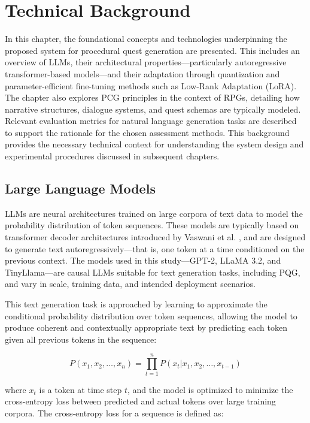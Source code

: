 \clearpage

\chapter{Technical Background}

In this chapter, the foundational concepts and technologies underpinning the proposed system for procedural
quest generation are presented. This includes an overview of
LLMs, their architectural properties—particularly autoregressive transformer-based models—and
their adaptation through quantization and parameter-efficient fine-tuning methods
such as Low-Rank Adaptation (LoRA). The chapter also explores PCG principles
in the context of RPGs, detailing how narrative structures, dialogue systems, and quest
schemas are typically modeled. Relevant evaluation metrics for natural language generation
tasks are described to support the rationale for the chosen assessment methods. This
background provides the necessary technical context for understanding the system design
and experimental procedures discussed in subsequent chapters.

\section{Large Language Models}

LLMs are neural architectures trained on large corpora of text data to model the probability
distribution of token sequences. These models are typically based on transformer
decoder architectures introduced by Vaswani et al. \cite{vaswani2017attention}, and are designed to generate text
autoregressively—that is, one token at a time conditioned on the previous context. The
models used in this study—GPT-2, LLaMA 3.2, and TinyLlama—are causal LLMs suitable
for text generation tasks, including PQG, and vary in scale, training data, and
intended deployment scenarios.

This text generation task is approached by learning to approximate the conditional
probability distribution over token sequences, allowing the model to produce coherent and
contextually appropriate text by predicting each token given all previous tokens in the
sequence:

\begin{equation}
  P(x_1, x_2, \dots, x_n) = \prod_{t=1}^n P(x_t | x_1, x_2, \dots, x_{t-1})
  \label{tokengen}
\end{equation}

where $x_t$ is a token at time step $t$, and the model is optimized to minimize the cross-entropy
loss between predicted and actual tokens over large training corpora. The cross-entropy
loss for a sequence is defined as:

